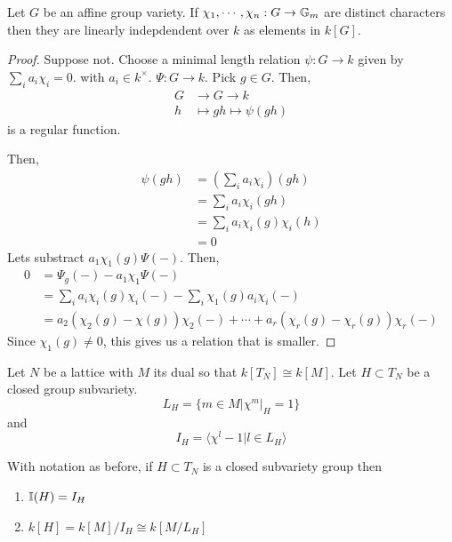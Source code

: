 \documentclass[12pt]{amsart}
\begin{document}
\begin{lemma}
    Let $G$ be an affine group variety. If $\chi_1, \cdots, \chi_n: G \to \mathbb G_m$ are distinct characters then they are linearly indepdendent over $k$ as elements in $k[G]$. 
\end{lemma}

\begin{proof}
    Suppose not. Choose a minimal length relation $\psi: G \to k$ given by $\sum_i a_i\chi_i = 0$. with $a_i \in k^\times$. $\Psi: G \to k$. Pick $g \in G$. Then, 
    \begin{align*}
        G &\to G \to k \\
        h &\mapsto gh \mapsto \psi(gh) 
    \end{align*}
    is a regular function. 

    Then, 
    \begin{align*}
        \psi(gh) &= (\sum_i a_i \chi_i)(gh) \\
        &= \sum_i a_i\chi_i(gh) \\
        &= \sum_i a_i \chi_i(g)\chi_i(h) \\
        &= 0
    \end{align*}
    Lets substract $a_1\chi_1(g)\Psi(-)$. Then, 
    \begin{align*}
        0 &= \Psi_g(-) - a_1\chi_1\Psi(-) \\
        &= \sum_{i} a_i\chi_i(g)\chi_i(-) - \sum_i \chi_1(g)a_i\chi_i(-) \\
        &= a_2(\chi_2(g) - \chi(g))\chi_2(-) + \cdots + a_r(\chi_r(g) - \chi_r(g))\chi_r(-)
    \end{align*} 
    Since $\chi_1(g) \neq 0$, this gives us a relation that is smaller. 
\end{proof}

\begin{definition}
    Let $N$ be a lattice with $M$ its dual so that $k[T_N] \cong k[M]$. Let $H \subset T_N$ be a closed group subvariety. 
    \[ L_H = \{ m \in M | \chi^m|_H = 1\}\]
    and 
    \[ I_H = \langle \chi^l -1 | l \in L_H \rangle \]
\end{definition}

\begin{theorem}
    With notation as before, if $H \subset T_N$ is a closed subvariety group then 
    \begin{enumerate}
        \item $\mathbb I(H) = I_H$
        \item $k[H] = k[M]/I_H \cong k[M/L_H]$
    \end{enumerate}
\end{theorem}
\end{document}
